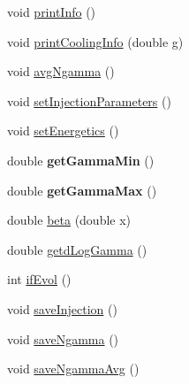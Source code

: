 \begin{DoxyCompactItemize}
void \hyperlink{classelectrons_ace657f207a4f68058b2606ff2772f3c5}{print\-Info} ()
\item 
void \hyperlink{classelectrons_a6e630bdecdc411683d02bbcf8aa82a56}{print\-Cooling\-Info} (double g)
\item 
void \hyperlink{classelectrons_af5e619dff4d9716328664a9625b6e8dd}{avg\-Ngamma} ()
\item 
void \hyperlink{classelectrons_ad94a7b6cc694ef0e70f7efaadef8463d}{set\-Injection\-Parameters} ()
\item 
void \hyperlink{classelectrons_aac9514f742569f37097d13b3ea04239a}{set\-Energetics} ()
\item 
\hypertarget{classelectrons_ad94d84888078393333deedf0fbdad3dd}{double {\bfseries get\-Gamma\-Min} ()}\label{classelectrons_ad94d84888078393333deedf0fbdad3dd}

\item 
\hypertarget{classelectrons_aa5dfd8ba29a4bc1b7de5bf7bf64d69e3}{double {\bfseries get\-Gamma\-Max} ()}\label{classelectrons_aa5dfd8ba29a4bc1b7de5bf7bf64d69e3}

\item 
double \hyperlink{classelectrons_a22aacb80ac20a46f471430db72c95b71}{beta} (double x)
\item 
double \hyperlink{classelectrons_a4e3d4179ce211bd732580b49914874e6}{getd\-Log\-Gamma} ()
\item 
int \hyperlink{classelectrons_a18a3cd4a19f833931632da1f9800141f}{if\-Evol} ()
\item 
void \hyperlink{classelectrons_ab509cb088f16247eec3a15b9c35bc23e}{save\-Injection} ()
\item 
void \hyperlink{classelectrons_ae1bc246f7783a9b65bd1f1678bfe5cd2}{save\-Ngamma} ()
\item 
void \hyperlink{classelectrons_aac83390f974136b1bc365b36ef460723}{save\-Ngamma\-Avg} ()
\end{DoxyCompactItemize}
